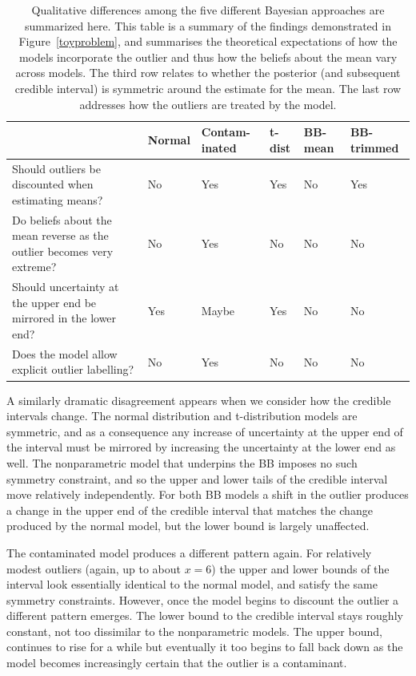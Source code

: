\documentclass[doc]{apa6}
\begin{document}
{\begin{table}[p]
\caption{  Qualitative differences among the five different Bayesian approaches are summarized here. This table is a summary of the findings demonstrated in Figure~\ref{toyproblem}, and summarises the theoretical expectations of how the models incorporate the outlier and thus how the beliefs about the mean vary across models. The third  row relates to whether the posterior (and subsequent credible interval) is symmetric around the estimate for the mean. The last row addresses how the outliers are treated by the model.}
\label{qualitativediffs}
\vspace*{6pt}
\begin{tabular}{p{6cm}|p{1.5cm} p{1.5cm} p{1.5cm} p{1.5cm} p{1.5cm}}\small
& Normal & Contam-inated & t-dist& BB-mean & BB-trimmed \\ \hline
Should outliers be discounted when estimating means? & No & Yes & Yes & No & Yes \\
Do beliefs about the mean reverse as the outlier becomes very extreme? & No & Yes & No & No & No \\
Should uncertainty at the upper end be mirrored in the lower end? & Yes & Maybe & Yes & No & No \\
Does the model allow explicit outlier labelling? & No & Yes & No & No & No
\end{tabular}
\end{table}



A similarly dramatic disagreement appears when we consider how the credible intervals change. The normal distribution   and  t-distribution models are     symmetric, and as a consequence any increase of uncertainty at the upper end of the interval must be mirrored by increasing the uncertainty at the lower end as well. The nonparametric model that underpins the BB imposes no such symmetry constraint, and so the upper and lower tails of the credible interval move relatively independently. For both BB models a shift in the outlier produces a change in the upper end of the credible interval that matches the change produced by the normal model, but the lower bound is largely unaffected.

The contaminated model produces a different pattern again. For relatively modest outliers (again, up to about $x=6$) the upper and lower bounds of the interval look essentially identical to the normal model, and satisfy the same symmetry constraints. However, once the model begins to discount the outlier a different pattern emerges. The lower bound to the credible interval stays roughly constant, not too dissimilar to the nonparametric models. The upper bound, continues to rise for a while but eventually it too begins to fall back down as the model becomes increasingly certain that the outlier is a contaminant.

}
\end{document}

